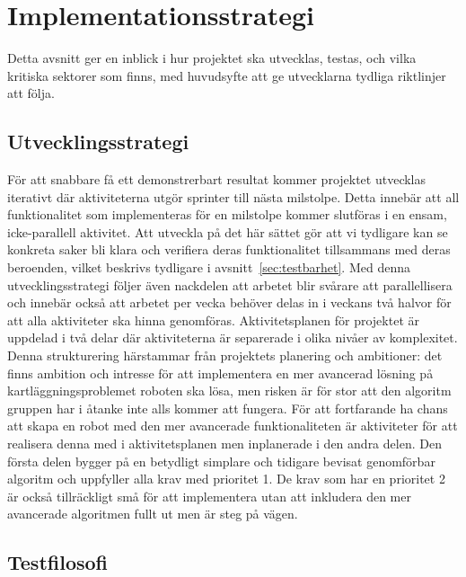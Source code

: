 \documentclass{article}
\begin{document}
\clearpage

\section{Implementationsstrategi}
Detta avsnitt ger en inblick i hur projektet ska utvecklas, testas, och vilka kritiska sektorer som finns, med huvudsyfte att ge utvecklarna tydliga riktlinjer att följa.

\subsection{Utvecklingsstrategi}
För att snabbare få ett demonstrerbart resultat kommer projektet utvecklas iterativt där aktiviteterna utgör sprinter till nästa milstolpe. Detta innebär att all funktionalitet som implementeras för en milstolpe kommer slutföras i en ensam, icke-parallell aktivitet. Att utveckla på det här sättet gör att vi tydligare kan se konkreta saker bli klara och verifiera deras funktionalitet tillsammans med deras beroenden, vilket beskrivs tydligare i avsnitt~\ref{sec:testbarhet}. Med denna utvecklingsstrategi följer även nackdelen att arbetet blir svårare att parallellisera och innebär också att arbetet per vecka behöver delas in i veckans två halvor för att alla aktiviteter ska hinna genomföras.
\newline\newline
Aktivitetsplanen för projektet är uppdelad i två delar där aktiviteterna är separerade i olika nivåer av komplexitet. Denna strukturering härstammar från projektets planering och ambitioner: det finns ambition och intresse för att implementera en mer avancerad lösning på kartläggningsproblemet roboten ska lösa, men risken är för stor att den algoritm gruppen har i åtanke inte alls kommer att fungera. För att fortfarande ha chans att skapa en robot med den mer avancerade funktionaliteten är aktiviteter för att realisera denna med i aktivitetsplanen men inplanerade i den andra delen. Den första delen bygger på en betydligt simplare och tidigare bevisat genomförbar algoritm och uppfyller alla krav med prioritet 1. De krav som har en prioritet 2 är också tillräckligt små för att implementera utan att inkludera den mer avancerade algoritmen fullt ut men är steg på vägen.

\subsection{Testfilosofi}
\end{document}
